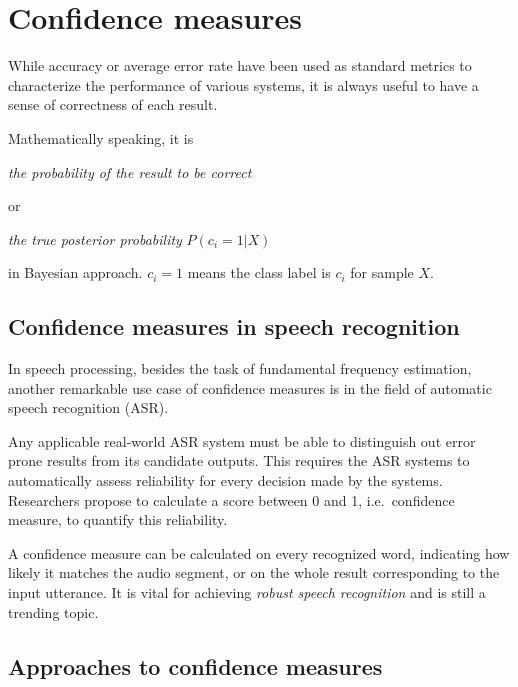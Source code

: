 \documentclass[11pt,a4paper]{report}
\begin{document}
\newpage

\section{Confidence measures}

While accuracy or average error rate have been used as standard metrics to characterize the performance of various systems, it is always useful to have a sense of correctness of each result.

\bigskip

Mathematically speaking, it is

\begin{center}
  \textit{the probability of the result to be correct}
\end{center}

or

\begin{center}
  \textit{the true posterior probability} \(P (c_i = 1 | X)\)
\end{center}

in Bayesian approach.
\(c_i = 1\) means the class label is \(c_i\) for sample \(X\).

\subsection{Confidence measures in speech recognition}

In speech processing, besides the task of fundamental frequency estimation, another remarkable use case of confidence measures is in the field of automatic speech recognition (ASR).

Any applicable real-world ASR system must be able to distinguish out error prone results from its candidate outputs.
This requires the ASR systems to automatically assess reliability for every decision made by the systems.
Researchers propose to calculate a score between 0 and 1, i.e.\ confidence measure, to quantify this reliability.

A confidence measure can be calculated on every recognized word, indicating how likely it matches the audio segment, or on the whole result corresponding to the input utterance.
It is vital for achieving \textit{robust speech recognition} and is still a trending topic.

\subsection{Approaches to confidence measures}
\end{document}
